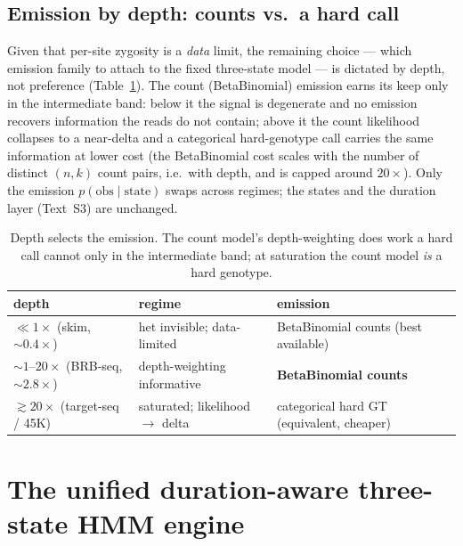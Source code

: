 \documentclass[11pt]{article}
\begin{document}
\subsection{Emission by depth: counts vs.\ a hard call}
\label{sec:emission-by-depth}

Given that per-site zygosity is a \emph{data} limit, the remaining choice --- which
emission family to attach to the fixed three-state model --- is dictated by depth,
not preference (Table~\ref{tab:depth-regime}). The count (BetaBinomial) emission
earns its keep only in the intermediate band: below it the signal is degenerate and
no emission recovers information the reads do not contain; above it the count
likelihood collapses to a near-delta and a categorical hard-genotype call carries
the same information at lower cost (the BetaBinomial cost scales with the number of
distinct $(n,k)$ count pairs, i.e.\ with depth, and is capped around $20\times$).
Only the emission $p(\text{obs}\mid\text{state})$ swaps across regimes; the states
and the duration layer (Text~S3) are unchanged.
\begin{table}[t]
\centering
\small
\begin{tabular}{@{}l l l@{}}
\toprule
depth & regime & emission \\
\midrule
$\ll 1\times$ (skim, ${\sim}0.4\times$) & het invisible; data-limited & BetaBinomial counts (best available) \\
${\sim}1$--$20\times$ (BRB-seq, ${\sim}2.8\times$) & depth-weighting informative & \textbf{BetaBinomial counts} \\
$\gtrsim 20\times$ (target-seq / 45K) & saturated; likelihood $\to$ delta & categorical hard GT (equivalent, cheaper) \\
\bottomrule
\end{tabular}
\caption{Depth selects the emission. The count model's depth-weighting does work a
hard call cannot only in the intermediate band; at saturation the count model
\emph{is} a hard genotype.}
\label{tab:depth-regime}
\end{table}

\section{The unified duration-aware three-state HMM engine}
\label{sec:engine}
\end{document}
